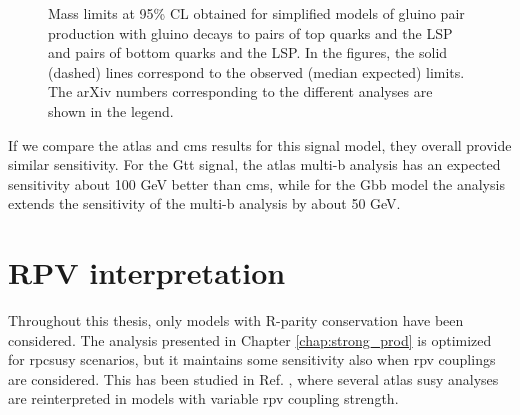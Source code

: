 \begin{figure}[htbp]
	\centering 
	\caption{Mass limits at 95\% CL obtained for simplified models of gluino pair production 
	with gluino decays to  pairs of top quarks and the LSP and 
	pairs of bottom quarks and the LSP. 
	In the figures, the solid (dashed) 
	lines correspond to the observed (median expected) limits. The arXiv numbers corresponding to the different analyses are shown in the legend.
	}
	\label{fig:limits_GbbGtt_comp}
\end{figure}

If we compare the \gls{atlas} and \gls{cms} results for this signal model, 
they overall provide similar sensitivity. 
For the Gtt signal, the \gls{atlas} multi-b analysis has an expected sensitivity about 100 GeV better than \gls{cms}, while 
for the Gbb model the \htmiss analysis extends the sensitivity of the multi-b analysis by about 50 GeV.

\FloatBarrier

\section{RPV interpretation}
\label{sec:rpvrpc}

Throughout this thesis, only models with R-parity conservation have been considered. 
The analysis presented in Chapter \ref{chap:strong_prod} is optimized for 
\gls{rpcsusy} scenarios, but it maintains some sensitivity also when \gls{rpv} couplings are considered. 
This has been studied in Ref. \cite{ATLAS-CONF-2018-003}, where several \gls{atlas} \gls{susy} analyses 
are reinterpreted in models with variable \gls{rpv} coupling strength.

